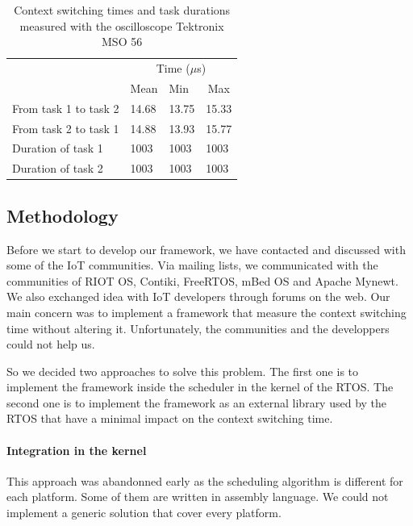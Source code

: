 \begin{table}[!ht]
  \centering
  \begin{tabular}{llll}
                        & \multicolumn{3}{c}{Time ($\mu$s)}                              \\ \cline{2-4} 
                        & \multicolumn{1}{c}{Mean} & Min   & \multicolumn{1}{c}{Max} \\ \cline{2-4} 
  From task 1 to task 2 & 14.68                    & 13.75 & 15.33                   \\
  From task 2 to task 1 & 14.88                    & 13.93 & 15.77                   \\
  Duration of task 1    & 1003                     & 1003  & 1003                    \\
  Duration of task 2    & 1003                     & 1003  & 1003                   
  \end{tabular}
  \caption{Context switching times and task durations measured with the oscilloscope Tektronix MSO 56}
  \label{tab:reference-measurement}
\end{table}


\subsection{Methodology}

Before we start to develop our framework, we have contacted and discussed with some of the IoT communities.
Via mailing lists, we communicated with the communities of RIOT OS, Contiki, FreeRTOS, mBed OS and Apache Mynewt.
We also exchanged idea with IoT developers through forums on the web.
Our main concern was to implement a framework that measure the context switching time without altering it.
Unfortunately, the communities and the developpers could not help us.

So we decided two approaches to solve this problem.
The first one is to implement the framework inside the scheduler in the kernel of the RTOS.
The second one is to implement the framework as an external library used by the RTOS that have a minimal impact on the context switching time.

\paragraph{Integration in the kernel}
This approach was abandonned early as the scheduling algorithm is different for each platform.
Some of them are written in assembly language.
We could not implement a generic solution that cover every platform.

